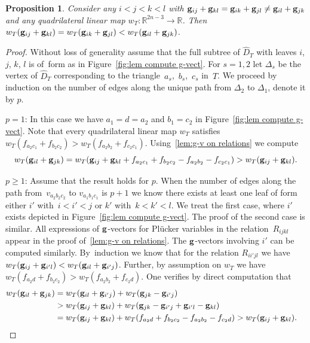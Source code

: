 \documentclass[10pt,a4paper]{amsart}
\newcommand{\thlabel}[1]{\label{#1}}
\newcommand{\thref}[1]{\ref{#1}}
\newtheorem{Proposition}[Theorem]{Proposition}
\numberwithin{equation}{section}
\begin{document}
\begin{Proposition}\thlabel{prop:wt map}
Consider any $i<j<k<l$ with ${\bf g}_{ij}+{\bf g}_{kl}={\bf g}_{ik}+{\bf g}_{jl}\not = {\bf g}_{il}+{\bf g}_{jk}$ and any quadrilateral linear map $w_T\colon \mathbb R^{2n-3}\to \mathbb R$. Then $w_T({\bf g}_{ij}+{\bf g}_{kl})=w_T({\bf g}_{ik}+{\bf g}_{jl}) < w_T({\bf g}_{il}+{\bf g}_{jk})$.
\end{Proposition}

\begin{proof}
Without loss of generality assume that the full subtree of $\widehat D_T$ with leaves $i$, $j$, $k$, $l$ is of~form as in Figure~\ref{fig:lem compute g-vect}.
For $s=1,2$ let $\Delta_s$ be the vertex of $\widehat D_T$ corresponding to the tri\-angle~$a_s$,~$b_s$,~$c_s$ in~$T$.
We proceed by induction on the number of edges along the unique path from $\Delta_2$ to $\Delta_1$, denote it by $p$.

\medskip \noindent
$p=1$: In this case we have $a_1=d=a_2$ and $b_1={c_2}$ in Figure~\ref{fig:lem compute g-vect}.
 Note that every quadrilateral linear map $w_T$ satisfies $w_T({f}_{a_2c_1}+{f}_{b_2c_2})>w_T({f}_{a_2b_2}+{f}_{c_2c_1})$.
 Using~\thref{lem:g-v on relations} we compute
 \begin{displaymath}
 w_T({\bf g}_{il}+{\bf g}_{jk})=w_T({\bf g}_{ij}+{\bf g}_{kl} + f_{a_2c_1}+f_{b_2c_2} - f_{a_2b_2}-f_{c_2c_1}) > w_T({\bf g}_{ij}+{\bf g}_{kl}).
 \end{displaymath}

\medskip \noindent
$p\ge 1$: Assume that the result holds for $p$. When the number of edges along the path from~$v_{a_2b_2c_2}$ to $v_{a_1b_1c_1}$ is $p+1$ we know there exists at least one leaf of form either $i'$ with~$i<i'<j$ or $k'$ with~$k<k'<l$.
 We treat the first case, where $i'$ exists depicted in Figure~\ref{fig:lem compute g-vect}.
 The proof of the second case is similar.
 All expressions of ${\bf g}$-vectors for Pl\"ucker variables in the relation~$R_{ijkl}$ appear in the proof of~\thref{lem:g-v on relations}.
 The ${\bf g}$-vectors involving $i'$ can be computed similarly.
 By~induction we know that for the relation $R_{ii'jl}$ we have $w_T({\bf g}_{ij}+{\bf g}_{i'l})<w_T({\bf g}_{il}+{\bf g}_{i'j})$.
 Further, by assumption on $w_T$ we have $w_T({f}_{a_2d}+{f}_{b_2c_2})>w_T({f}_{a_2b_2}+{f}_{c_2d})$.
 One verifies by direct computation that
 \begin{align*}
 w_T({\bf g}_{il}+{\bf g}_{jk}) &= w_T({\bf g}_{il}+{\bf g}_{i'j}) + w_T({\bf g}_{jk}-{\bf g}_{i'j}) \\
 &> w_T({\bf g}_{ij}+{\bf g}_{kl}) + w_T({\bf g}_{jk}-{\bf g}_{i'j}+{\bf g}_{i'l} - {\bf g}_{kl})\\
 &= w_T({\bf g}_{ij}+{\bf g}_{kl}) + w_T({f}_{a_2d}+{f}_{b_2c_2}-{f}_{a_2b_2}-{f}_{c_2d}) > w_T({\bf g}_{ij}+{\bf g}_{kl}).\!\!\!\!\!\! \tag*{\qed}
\end{align*}
\renewcommand{\qed}{}
\end{proof}
\end{document}
